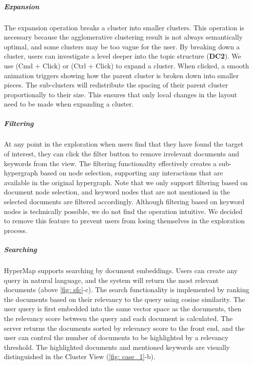 \vspace*{-0.3cm}
\subparagraph*{Expansion}
The expansion operation breaks a cluster into smaller clusters.
This operation is necessary because the agglomerative clustering result is not always semantically optimal, and some clusters may be too vague for the user.
By breaking down a cluster, users can investigate a level deeper into the topic structure (\textbf{DC2}).
We use (Cmd + Click) or (Ctrl + Click) to expand a cluster.
When clicked, a smooth animation triggers showing how the parent cluster is broken down into smaller pieces.
The sub-clusters will redistribute the spacing of their parent cluster proportionally to their size.
This ensures that only local changes in the layout need to be made when expanding a cluster.

\vspace*{-0.3cm}
\subparagraph*{Filtering}
At any point in the exploration when users find that they have found the target of interest,
they can click the filter button to remove irrelevant documents and keywords from the view.
The filtering functionality effectively creates a sub-hypergraph based on node selection, supporting any interactions that are available in the original hypergraph.
Note that we only support filtering based on document node selection, and keyword nodes that are not mentioned in the selected documents are filtered accordingly.
Although filtering based on keyword nodes is technically possible, we do not find the operation intuitive.
We decided to remove this feature to prevent users from losing themselves in the exploration process.

\vspace*{-0.3cm}
\subparagraph*{Searching}
HyperMap supports searching by document embeddings.
Users can create any query in natural language, and the system will return the most relevant documents (above \autoref{fig: sfc}-c).
The search functionality is implemented by ranking the documents based on their relevancy to the query using cosine similarity.
The user query is first embedded into the same vector space as the documents, then the relevancy score between the query and each document is calculated.
The server returns the documents sorted by relevancy score to the front end, and the user can control the number of documents to be highlighted by a relevancy threshold. 
The highlighted documents and mentioned keywords are visually distinguished in the Cluster View (\autoref{fig: case_1}-b).

